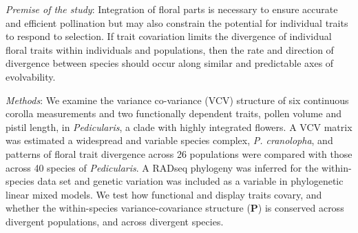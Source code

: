 \documentclass[12pt,letterpaper]{article}
\def\P{\emph{Pedicularis}}
\def\PM{{\bf P}}
\begin{document}
\begin{itemize}
\small{
\item \emph{Premise of the study}: Integration of floral parts is necessary to ensure accurate and efficient pollination but may also constrain the potential for individual traits to respond to selection. If trait covariation limits the divergence of individual floral traits within individuals and populations, then the rate and direction of divergence between species should occur along similar and predictable axes of evolvability. 



\item \emph{Methods}: We examine the variance co-variance (VCV) structure of six continuous corolla measurements and two functionally dependent traits, pollen volume and pistil length, in \emph{Pedicularis}, a clade with highly integrated flowers. A VCV matrix was estimated a widespread and variable species complex, \emph{P. cranolopha}, and patterns of floral trait divergence across 26 populations were compared with those across 40 species of \emph{Pedicularis}. A RADseq phylogeny was inferred for the within-species data set and genetic variation was included as a variable in phylogenetic linear mixed models. We test how functional and display traits covary, and whether the within-species variance-covariance structure (\PM) is conserved across divergent populations, and across divergent species. 

}
\end{itemize}
\end{document}
